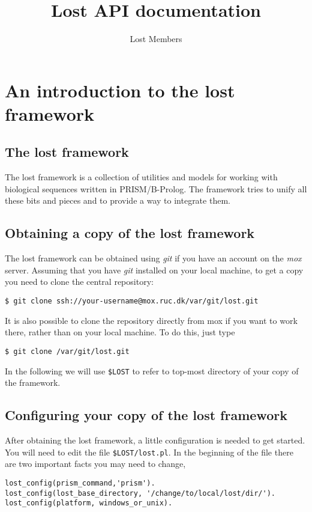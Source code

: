 \documentclass{book}
\title{Lost API documentation}
\author{Lost Members}
\begin{document}
\maketitle


\tableofcontents
%

\chapter{An introduction to the lost framework}

\section{The lost framework}

The lost framework is a collection of utilities and models for
working with biological sequences written in PRISM/B-Prolog. 
The framework tries to unify all these bits and pieces and to
provide a way to integrate them.

\section{Obtaining a copy of the lost framework}

The lost framework can be obtained using \emph{git} if you have an account on the
\emph{mox} server. Assuming that you have \emph{git} installed on your
local machine, to get a copy you need to clone the central repository:
\begin{verbatim}
$ git clone ssh://your-username@mox.ruc.dk/var/git/lost.git
\end{verbatim}

It is also possible to clone the repository directly from mox if you
want to work there, rather than on your local machine. To do this,
just type 
\begin{verbatim}
$ git clone /var/git/lost.git
\end{verbatim}

In the following we will use \texttt{\$LOST} to refer to top-most
directory of your copy of the framework. 

\section{Configuring your copy of the lost framework}


After obtaining the lost framework, a little configuration is needed to get started.
You will need to edit the file \texttt{\$LOST/lost.pl}.
In the beginning of the file there are two important facts you may need to change,
\begin{verbatim}
lost_config(prism_command,'prism').
lost_config(lost_base_directory, '/change/to/local/lost/dir/').
lost_config(platform, windows_or_unix).
\end{verbatim}
\end{document}
